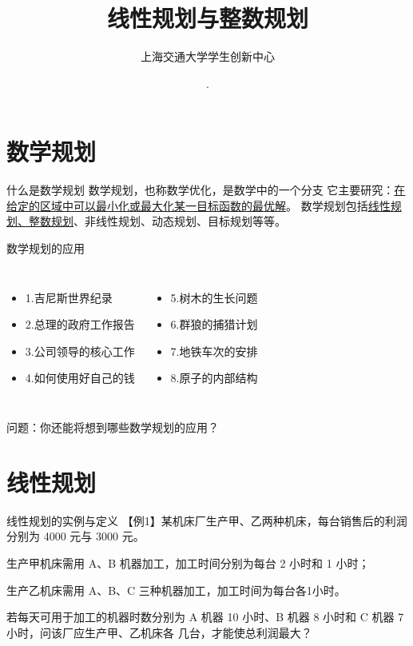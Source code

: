 \documentclass[xcolor=table,dvipsnames,svgnames,aspectratio=169,fontset=ubuntu]{ctexbeamer}
\author{上海交通大学学生创新中心}
\date{\the\year \,.\the\month \,}
\title[流形上的Soblev不等式与嵌入]
{\textnormal{线性规划与整数规划}}
\begin{document}
\maketitle
\section{数学规划}
\begin{frame}{什么是数学规划}
  数学规划，也称数学优化，是数学中的一个分支
  \vskip 12pt
  它主要研究：\underline{在给定的区域中可以最小化或最大化某一目标函数的最优解}。
  \vskip 12pt
  数学规划包括\underline{线性规划、整数规划}、非线性规划、动态规划、目标规划等等。
\end{frame}

\begin{frame}{数学规划的应用}
  \begin{columns}
    \begin{itemize}
      \item 1.吉尼斯世界纪录
      \vskip 15pt
      \item 2.总理的政府工作报告
      \vskip 15pt
      \item 3.公司领导的核心工作
      \vskip 15pt
      \item 4.如何使用好自己的钱
    \end{itemize}
    \begin{itemize}
      \item 5.树木的生长问题
      \vskip 15pt
      \item 6.群狼的捕猎计划
      \vskip 15pt
      \item 7.地铁车次的安排 
      \vskip 15pt
      \item 8.原子的内部结构
    \end{itemize}
  \end{columns}
  \vskip 30pt
  问题：你还能将想到哪些数学规划的应用？
\end{frame}

\section{线性规划}

\begin{frame}{线性规划的实例与定义}
  【例1】某机床厂生产甲、乙两种机床，每台销售后的利润分别为 4000 元与 3000 元。

  \vskip 5pt
  生产甲机床需用 A、B 机器加工，加工时间分别为每台 2 小时和 1 小时；
  
  \vskip 5pt
  生产乙机床需用 A、B、C 三种机器加工，加工时间为每台各1小时。
  
  \vskip 5pt
  若每天可用于加工的机器时数分别为 A 机器 10 小时、B 机器 8 小时和 C 机器 7 小时，问该厂应生产甲、乙机床各
几台，才能使总利润最大？
\end{frame}
\end{document}
